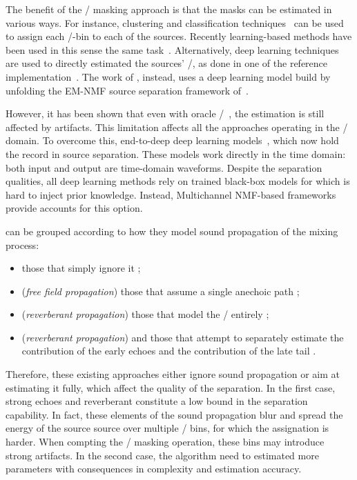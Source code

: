 \mynewline
The benefit of the \TF/ masking approach is that the masks can be estimated in various ways.
For instance, clustering and classification techniques~ can be used to assign each \TF/-bin to each of the sources.
Recently learning-based methods have been used in this sense the same task~.
Alternatively, deep learning techniques are used to directly estimated the sources' \TF/, as done in one of the reference implementation~.
The work of , instead, uses a deep learning model build by unfolding the EM-NMF source separation framework of~.

\mynewline
However, it has been shown that even with oracle \TF/~, the estimation is still affected by artifacts.
This limitation affects all the approaches operating in the \TF/ domain.
To overcome this, end-to-deep deep learning models~, which now hold the record in source separation.
These models work directly in the time domain: both input and output are time-domain waveforms.
Despite the separation qualities, all deep learning methods rely on trained black-box models for which is hard to inject prior knowledge.
Instead, Multichannel NMF-based frameworks provide accounts for this option.

 can be grouped according to how they model sound propagation of the mixing process:
\begin{itemize}
    \item those that simply ignore it ;
    \item (\textit{free field propagation}) those that assume a single anechoic path  ;
    \item (\textit{reverberant propagation}) those that model the \RTFs/ entirely ;
    \item (\textit{reverberant propagation}) and those that attempt to separately estimate the contribution of the early echoes and the contribution of the late tail .
\end{itemize}
Therefore, these existing approaches either ignore sound propagation or aim at estimating it fully, which affect the quality of the separation.
In the first case, strong echoes and reverberant constitute a low bound in the separation capability.
In fact, these elements of the sound propagation blur and spread the energy of the source source over multiple \TF/ bins, for which the assignation is harder.
When compting the \TF/ masking operation, these bins may introduce strong artifacts.
In the second case, the algorithm need to estimated more parameters with consequences in complexity and estimation accuracy.

